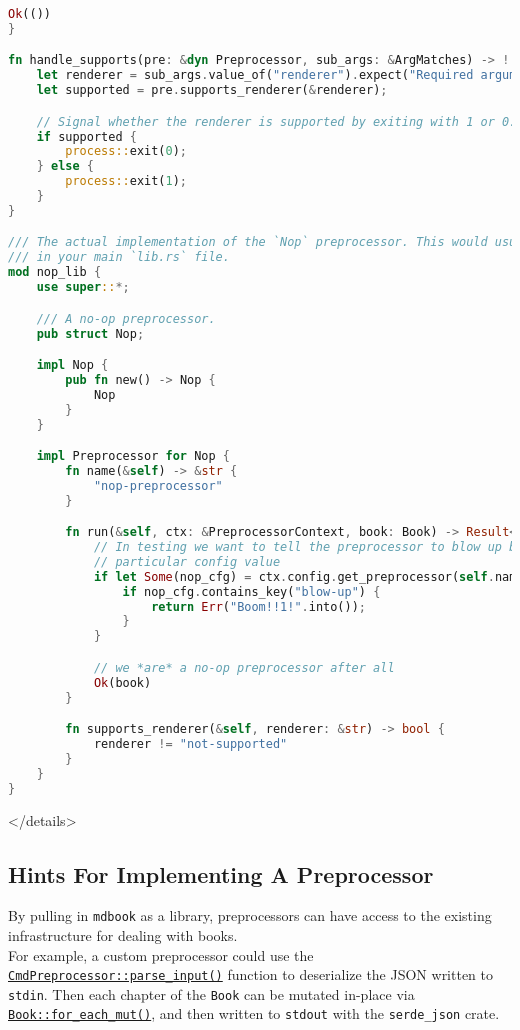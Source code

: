 \documentclass{article}
\begin{document}
\begin{lstlisting}[language=rust]
    Ok(())
}

fn handle_supports(pre: &dyn Preprocessor, sub_args: &ArgMatches) -> ! {
    let renderer = sub_args.value_of("renderer").expect("Required argument");
    let supported = pre.supports_renderer(&renderer);

    // Signal whether the renderer is supported by exiting with 1 or 0.
    if supported {
        process::exit(0);
    } else {
        process::exit(1);
    }
}

/// The actual implementation of the `Nop` preprocessor. This would usually go
/// in your main `lib.rs` file.
mod nop_lib {
    use super::*;

    /// A no-op preprocessor.
    pub struct Nop;

    impl Nop {
        pub fn new() -> Nop {
            Nop
        }
    }

    impl Preprocessor for Nop {
        fn name(&self) -> &str {
            "nop-preprocessor"
        }

        fn run(&self, ctx: &PreprocessorContext, book: Book) -> Result<Book, Error> {
            // In testing we want to tell the preprocessor to blow up by setting a
            // particular config value
            if let Some(nop_cfg) = ctx.config.get_preprocessor(self.name()) {
                if nop_cfg.contains_key("blow-up") {
                    return Err("Boom!!1!".into());
                }
            }

            // we *are* a no-op preprocessor after all
            Ok(book)
        }

        fn supports_renderer(&self, renderer: &str) -> bool {
            renderer != "not-supported"
        }
    }
}


\end{lstlisting}
</details>

\subsection{Hints For Implementing A Preprocessor}
\label{Hints For Implementing A Preprocessor}
\label{hints-for-implementing-a-preprocessor}

By pulling in \lstinline|mdbook| as a library, preprocessors can have access to the
existing infrastructure for dealing with books.\\

For example, a custom preprocessor could use the
\href{https://docs.rs/mdbook/latest/mdbook/preprocess/trait.Preprocessor.html#method.parse_input}{\lstinline|CmdPreprocessor::parse_input()|} function to deserialize the JSON written to
\lstinline|stdin|. Then each chapter of the \lstinline|Book| can be mutated in-place via
\href{https://docs.rs/mdbook/latest/mdbook/book/struct.Book.html#method.for_each_mut}{\lstinline|Book::for_each_mut()|}, and then written to \lstinline|stdout| with the \lstinline|serde_json|
crate.\\
\end{document}
